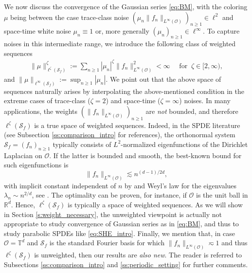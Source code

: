 \documentclass[reqno]{amsart}
\theoremstyle{plain}
\theoremstyle{remark}
\theoremstyle{plain}
\numberwithin{equation}{section}
\newcommand\cO{\mathcal{O}}
\def\R{{\mathbb R}}
\newcommand{\T}{\mathbb{T}}
\newcommand{\1}{\one}
\newcommand{\Sf}{\mathcal{S}_{f}}
\begin{document}
\smallskip

We now discuss the convergence of the Gaussian series \eqref{eq:BM}, with the coloring $\mu$ being between the case trace-class noise $(\mu_n \|f_n\|_{L^\infty(\cO)})_{n\geq 1}\in \ell^2$ and space-time white noise $\mu_n\equiv 1$ or, more generally $(\mu_n)_{n\geq 1}\in \ell^\infty$. 
To capture noises in this intermediate range, we introduce the following class of weighted sequences
\begin{align}
\label{eq: intro l zeta Sf condition}
    \|\mu\|_{\ell^\zeta(\Sf)}^\zeta:=\sum_{n\geq 1}|\mu_n|^\zeta 
    \|f_n\|_{L^\infty(\cO)}^2<\infty \quad \text{ for } \ \zeta\in [2,\infty),
\end{align}
and  $\|\mu\|_{\ell^\infty(\Sf)}:=\sup_{n\geq 1} |\mu_n| .$
We point out that the above space of sequences naturally arises by interpolating the above-mentioned condition in the extreme cases of trace-class ($\zeta=2$) and space-time ($\zeta=\infty$) noises. 
%
In many applications, the weights $(\|f_n\|_{L^\infty(\cO)})_{n\geq 1}$ are \emph{not} bounded, and therefore $\ell^\zeta(\Sf)$ is a true space of weighted sequences. 
Indeed, in the SPDE literature (see Subsection \ref{ss:comparison_intro} for references), the orthonormal system $\Sf=(f_n)_{n\geq 1}$ typically consists of $L^2$-normalized eigenfunctions of the Dirichlet Laplacian on $\cO$. If the latter is bounded and smooth, the best-known bound for such eigenfunctions is 
\begin{equation}
\label{eq:f_n_growth_in_general}
  \|f_n\|_{L^\infty(\cO)}\lesssim n^{(d-1)/2d},
\end{equation}
 with implicit constant independent of $n$ by \cite{grieser2002uniform} and Weyl's law for the eigenvalues $\lambda_n\sim n^{2/d}$, see \cite[p. 45]{hormander2007analysis}. 
%
The optimality can be proven, for instance, if $\cO$ is the unit ball in $\R^d$. Hence, $\ell^\zeta(\Sf)$ is typically a space of weighted sequences. 
As we will show in Section \ref{s:weight_necessary}, the unweighted viewpoint is actually not appropriate to study convergence of Gaussian series as in \eqref{eq:BM}, and thus to study parabolic SPDEs like \eqref{eq:SHE_intro}. Finally, we mention that, in case $\cO=\T^d$ and $\Sf$ is the standard Fourier basis for which $\|f_n\|_{L^\infty(\cO)}\eqsim 1$ and thus $\ell^\zeta(\Sf)$ is unweighted, then our results are \emph{also new}. The reader is referred to Subsections \ref{ss:comparison_intro} and \ref{ss:periodic_setting} for further comments.

\smallskip
\end{document}
